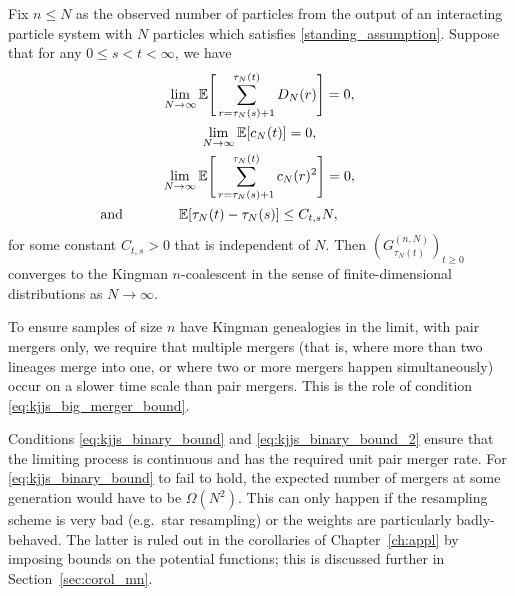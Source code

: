 \begin{theorem}\label{thm:kjjs_mainthm}
Fix $n \leq N$ as the observed number of particles from the output of an interacting particle system with $N$ particles which satisfies \ref{standing_assumption}.
Suppose that for any $0 \leq s < t < \infty$, we have
\begin{gather}\label{eq:kjjs_big_merger_bound}
\lim_{ N \rightarrow \infty } \E\Bigg[ \sum_{ r = \tau_N( s ) + 1 }^{ \tau_N( t ) } D_N( r ) \Bigg] = 0, \\
\label{eq:kjjs_binary_bound}
\lim_{ N \rightarrow \infty } \E[ c_N( t ) ] = 0, \\
\label{eq:kjjs_binary_bound_2}
\lim_{ N \rightarrow \infty } \E\Bigg[ \sum_{ r = \tau_N( s ) + 1 }^{ \tau_N( t ) } c_N( r )^2 \Bigg] = 0, \\
\label{eq:kjjs_tau_bound}
\text{and}\qquad\qquad\E[ \tau_N( t ) - \tau_N( s ) ] \leq C_{ t, s } N,\qquad\qquad\phantom{\text{and}}
\end{gather}
for some constant $C_{ t, s } > 0$ that is independent of $N$.
Then $( G_{ \tau_N( t ) }^{ ( n, N ) } )_{ t \geq 0 }$ converges to the Kingman $n$-coalescent in the sense of finite-dimensional distributions as $N \rightarrow \infty$. 
\end{theorem}

To ensure samples of size $n$ have Kingman genealogies in the limit, with pair mergers only, we require that multiple mergers (that is, where more than two lineages merge into one, or where two or more mergers happen simultaneously) occur on a slower time scale than pair mergers. 
This is the role of condition \eqref{eq:kjjs_big_merger_bound}.

Conditions \eqref{eq:kjjs_binary_bound} and \eqref{eq:kjjs_binary_bound_2} ensure that the limiting process is continuous and has the required unit pair merger rate.
For \eqref{eq:kjjs_binary_bound} to fail to hold, the expected number of mergers at some generation would have to be $\Omega(N^2)$. This can only happen if the resampling scheme is very bad (e.g.\ star resampling) or the weights are particularly badly-behaved. The latter is ruled out in the corollaries of Chapter~\ref{ch:appl} by imposing bounds on the potential functions; this is discussed further in Section~\ref{sec:corol_mn}.

